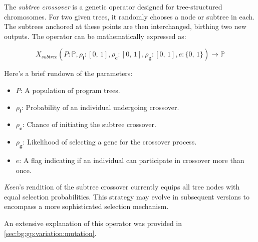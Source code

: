 \begin{definition}
    The \textit{subtree crossover} is a genetic operator designed for tree-structured chromosomes. For two given trees, 
    it randomly chooses a node or subtree in each. The subtrees anchored at these points are then interchanged, 
    birthing two new outputs. The operator can be mathematically expressed as:

    \begin{equation}
        X_{subtree}(P: \mathbb{P}, \rho_\mathbf{i}: [0,\, 1], \rho_\mathbf{c}: [0,\, 1], \rho_\mathbf{g}: [0,\, 1], e: \{0,\, 1\}) \to \mathbb{P}
    \end{equation}

    Here's a brief rundown of the parameters:

    \begin{itemize}
        \item \(P\): A population of program trees.
        \item \(\rho_\mathbf{i}\): Probability of an individual undergoing crossover.
        \item \(\rho_\mathbf{c}\): Chance of initiating the subtree crossover.
        \item \(\rho_\mathbf{g}\): Likelihood of selecting a gene for the crossover process.
        \item \(e\): A flag indicating if an individual can participate in crossover more than once.
    \end{itemize}
\end{definition}

\begin{remark}
    \textit{Keen}'s rendition of the subtree crossover currently equips all tree nodes with equal selection 
    probabilities. This strategy may evolve in subsequent versions to encompass a more sophisticated selection 
    mechanism.
\end{remark}

An extensive explanation of this operator was provided in \vref{sec:bg:gp:variation:mutation}.
